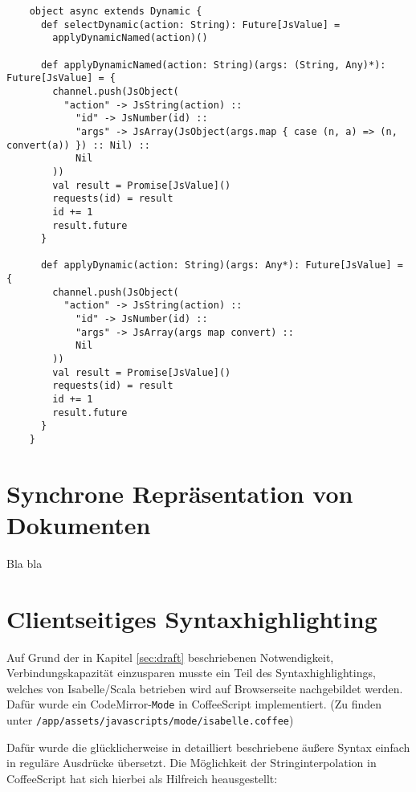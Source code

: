 \begin{lstlisting}
    object async extends Dynamic {
      def selectDynamic(action: String): Future[JsValue] =
        applyDynamicNamed(action)()

      def applyDynamicNamed(action: String)(args: (String, Any)*): Future[JsValue] = {
        channel.push(JsObject(
          "action" -> JsString(action) ::
            "id" -> JsNumber(id) ::
            "args" -> JsArray(JsObject(args.map { case (n, a) => (n, convert(a)) }) :: Nil) ::
            Nil
        ))
        val result = Promise[JsValue]()
        requests(id) = result
        id += 1
        result.future
      }

      def applyDynamic(action: String)(args: Any*): Future[JsValue] = {
        channel.push(JsObject(
          "action" -> JsString(action) ::
            "id" -> JsNumber(id) ::
            "args" -> JsArray(args map convert) ::
            Nil
        ))
        val result = Promise[JsValue]()
        requests(id) = result
        id += 1
        result.future
      }
    }
\end{lstlisting}

\clearpage

\section{Synchrone Repräsentation von Dokumenten}

Bla bla

\section{Clientseitiges Syntaxhighlighting}
\label{sec:syntax}

Auf Grund der in Kapitel \ref{sec:draft} beschriebenen Notwendigkeit, Verbindungskapazität
einzusparen musste ein Teil des Syntaxhighlightings, welches von Isabelle/Scala betrieben wird auf
Browserseite nachgebildet werden. Dafür wurde ein CodeMirror-\texttt{Mode} in CoffeeScript
implementiert. (Zu finden unter \texttt{/app/assets/javascripts/mode/isabelle.coffee})

Dafür wurde die glücklicherweise in \cite{isabelle} detailliert beschriebene äußere Syntax einfach
in reguläre Ausdrücke übersetzt. Die Möglichkeit der Stringinterpolation in CoffeeScript hat sich
hierbei als Hilfreich heausgestellt:

